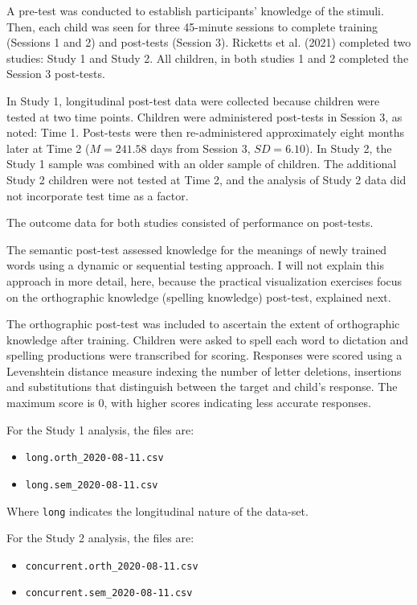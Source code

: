 \documentclass[
  letterpaper,
  DIV=11,
  numbers=noendperiod]{scrreprt}
\providecommand{\tightlist}{%
  \setlength{\itemsep}{0pt}\setlength{\parskip}{0pt}}\usepackage{longtable,booktabs,array}
\begin{document}
A pre-test was conducted to establish participants' knowledge of the
stimuli. Then, each child was seen for three 45-minute sessions to
complete training (Sessions 1 and 2) and post-tests (Session 3).
Ricketts et al. (2021) completed two studies: Study 1 and Study 2. All
children, in both studies 1 and 2 completed the Session 3 post-tests.

In Study 1, longitudinal post-test data were collected because children
were tested at two time points. Children were administered post-tests in
Session 3, as noted: Time 1. Post-tests were then re-administered
approximately eight months later at Time 2 (\(M = 241.58\) days from
Session 3, \(SD = 6.10\)). In Study 2, the Study 1 sample was combined
with an older sample of children. The additional Study 2 children were
not tested at Time 2, and the analysis of Study 2 data did not
incorporate test time as a factor.

The outcome data for both studies consisted of performance on
post-tests.

The semantic post-test assessed knowledge for the meanings of newly
trained words using a dynamic or sequential testing approach. I will not
explain this approach in more detail, here, because the practical
visualization exercises focus on the orthographic knowledge (spelling
knowledge) post-test, explained next.

The orthographic post-test was included to ascertain the extent of
orthographic knowledge after training. Children were asked to spell each
word to dictation and spelling productions were transcribed for scoring.
Responses were scored using a Levenshtein distance measure indexing the
number of letter deletions, insertions and substitutions that
distinguish between the target and child's response. The maximum score
is 0, with higher scores indicating less accurate responses.

For the Study 1 analysis, the files are:

\begin{itemize}
\tightlist
\item
  \texttt{long.orth\_2020-08-11.csv}
\item
  \texttt{long.sem\_2020-08-11.csv}
\end{itemize}

Where \texttt{long} indicates the longitudinal nature of the data-set.

For the Study 2 analysis, the files are:

\begin{itemize}
\tightlist
\item
  \texttt{concurrent.orth\_2020-08-11.csv}
\item
  \texttt{concurrent.sem\_2020-08-11.csv}
\end{itemize}
\end{document}
